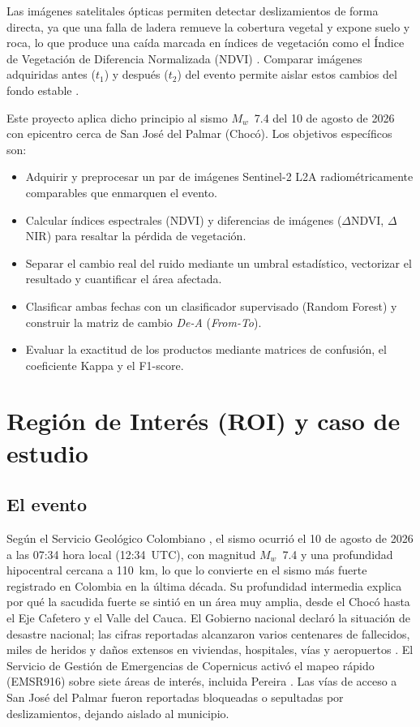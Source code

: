 \documentclass[12pt]{article}
\begin{document}
Las imágenes satelitales ópticas permiten detectar deslizamientos de forma directa, ya que una falla de ladera remueve la cobertura vegetal y expone suelo y roca, lo que produce una caída marcada en índices de vegetación como el Índice de Vegetación de Diferencia Normalizada (NDVI) \parencite{Tucker1979}. Comparar imágenes adquiridas antes ($t_1$) y después ($t_2$) del evento permite aislar estos cambios del fondo estable \parencite{Lillesand2015}.

Este proyecto aplica dicho principio al sismo $M_w$~7.4 del 10 de agosto de 2026 con epicentro cerca de San José del Palmar (Chocó). Los objetivos específicos son:
\begin{itemize}
    \item Adquirir y preprocesar un par de imágenes Sentinel-2 L2A radiométricamente comparables que enmarquen el evento.
    \item Calcular índices espectrales (NDVI) y diferencias de imágenes ($\Delta$NDVI, $\Delta$NIR) para resaltar la pérdida de vegetación.
    \item Separar el cambio real del ruido mediante un umbral estadístico, vectorizar el resultado y cuantificar el área afectada.
    \item Clasificar ambas fechas con un clasificador supervisado (Random Forest) y construir la matriz de cambio \emph{De-A} (\emph{From-To}).
    \item Evaluar la exactitud de los productos mediante matrices de confusión, el coeficiente Kappa y el F1-score.
\end{itemize}

\section{Región de Interés (ROI) y caso de estudio}
\subsection{El evento}
Según el Servicio Geológico Colombiano \parencite{SGC2026}, el sismo ocurrió el 10 de agosto de 2026 a las 07:34 hora local (12:34~UTC), con magnitud $M_w$~7.4 y una profundidad hipocentral cercana a 110~km, lo que lo convierte en el sismo más fuerte registrado en Colombia en la última década. Su profundidad intermedia explica por qué la sacudida fuerte se sintió en un área muy amplia, desde el Chocó hasta el Eje Cafetero y el Valle del Cauca. El Gobierno nacional declaró la situación de desastre nacional; las cifras reportadas alcanzaron varios centenares de fallecidos, miles de heridos y daños extensos en viviendas, hospitales, vías y aeropuertos \parencite{ReliefWeb2026}. El Servicio de Gestión de Emergencias de Copernicus activó el mapeo rápido (EMSR916) sobre siete áreas de interés, incluida Pereira \parencite{CEMS_EMSR916}. Las vías de acceso a San José del Palmar fueron reportadas bloqueadas o sepultadas por deslizamientos, dejando aislado al municipio.
\end{document}
